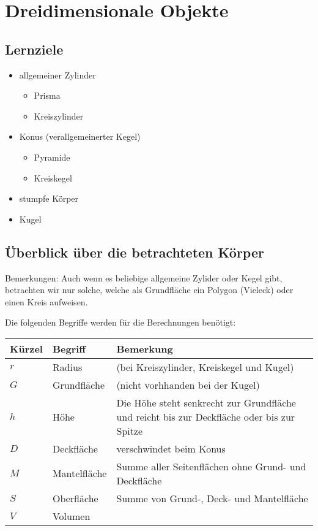 \section{Dreidimensionale Objekte}


\subsection*{Lernziele}
\begin{itemize}
\item allgemeiner Zylinder
  \begin{itemize}
  \item Prisma
  \item Kreiszylinder
    \end{itemize}
\item Konus (verallgemeinerter Kegel)
  \begin{itemize}
  \item Pyramide
  \item Kreiskegel
  \end{itemize}
  \item stumpfe Körper
  \item Kugel
\end{itemize}
\newpage
\subsection{Überblick über die betrachteten Körper}


Bemerkungen: Auch wenn es beliebige allgemeine Zylider oder Kegel
gibt, betrachten wir nur solche, welche als Grundfläche ein Polygon
(Vieleck) oder einen Kreis aufweisen.

Die folgenden Begriffe werden für die Berechnungen benötigt:

\begin{tabular}{|l|l|p{12cm}|}
  \hline
  Kürzel & Begriff& Bemerkung\\\hline
  $r$  & Radius & (bei Kreiszylinder, Kreiskegel und Kugel)\\\hline
  $G$  & Grundfläche & (nicht vorhhanden bei der Kugel)\\\hline
  $h$  & Höhe & Die Höhe steht senkrecht zur Grundfläche und reicht bis zur Deckfläche oder bis zur Spitze\\\hline
  $D$  & Deckfläche & verschwindet beim Konus\\\hline
  $M$  & Mantelfläche & Summe aller Seitenflächen ohne Grund- und Deckfläche\\\hline
  $S$  & Oberfläche & Summe von Grund-, Deck- und Mantelfläche\\\hline
  $V$  & Volumen & \\\hline
  \end{tabular} 

